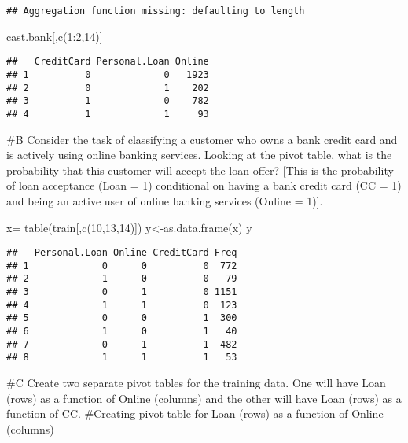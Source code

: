 \documentclass[
]{article}
\newenvironment{Shaded}{\begin{snugshade}}{\end{snugshade}}
\newcommand{\DecValTok}[1]{\textcolor[rgb]{0.00,0.00,0.81}{#1}}
\newcommand{\FunctionTok}[1]{\textcolor[rgb]{0.00,0.00,0.00}{#1}}
\newcommand{\NormalTok}[1]{#1}
\newcommand{\OtherTok}[1]{\textcolor[rgb]{0.56,0.35,0.01}{#1}}
\newcommand{\SpecialCharTok}[1]{\textcolor[rgb]{0.00,0.00,0.00}{#1}}
\begin{document}
\begin{verbatim}
## Aggregation function missing: defaulting to length
\end{verbatim}

\begin{Shaded}
\begin{Highlighting}[]
\NormalTok{cast.bank[,}\FunctionTok{c}\NormalTok{(}\DecValTok{1}\SpecialCharTok{:}\DecValTok{2}\NormalTok{,}\DecValTok{14}\NormalTok{)]}
\end{Highlighting}
\end{Shaded}

\begin{verbatim}
##   CreditCard Personal.Loan Online
## 1          0             0   1923
## 2          0             1    202
## 3          1             0    782
## 4          1             1     93
\end{verbatim}

\#B Consider the task of classifying a customer who owns a bank credit
card and is actively using online banking services. Looking at the pivot
table, what is the probability that this customer will accept the loan
offer? {[}This is the probability of loan acceptance (Loan = 1)
conditional on having a bank credit card (CC = 1) and being an active
user of online banking services (Online = 1){]}.

\begin{Shaded}
\begin{Highlighting}[]
\NormalTok{x}\OtherTok{=} \FunctionTok{table}\NormalTok{(train[,}\FunctionTok{c}\NormalTok{(}\DecValTok{10}\NormalTok{,}\DecValTok{13}\NormalTok{,}\DecValTok{14}\NormalTok{)])}
\NormalTok{y}\OtherTok{\textless{}{-}}\FunctionTok{as.data.frame}\NormalTok{(x)}
\NormalTok{y}
\end{Highlighting}
\end{Shaded}

\begin{verbatim}
##   Personal.Loan Online CreditCard Freq
## 1             0      0          0  772
## 2             1      0          0   79
## 3             0      1          0 1151
## 4             1      1          0  123
## 5             0      0          1  300
## 6             1      0          1   40
## 7             0      1          1  482
## 8             1      1          1   53
\end{verbatim}

\#C Create two separate pivot tables for the training data. One will
have Loan (rows) as a function of Online (columns) and the other will
have Loan (rows) as a function of CC. \#Creating pivot table for Loan
(rows) as a function of Online (columns)
\end{document}
